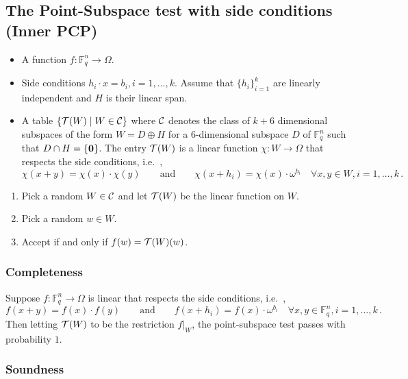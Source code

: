 \documentclass[10pt]{article}
\theoremstyle{definition}
\providecommand{\ie}{i.e.\ }
\numberwithin{equation}{section}
\newcommand\F{\mathbb{F}}
\renewcommand{\mapsto}{\to}
\begin{document}
\subsection{The Point-Subspace test with side conditions (Inner PCP)}\label{sec:point-subspace}

\begin{itemize}
\item A function $f: \F_q^n \mapsto \Omega$.
\item Side conditions $h_i \cdot x = b_i, i =1,\ldots, k$. Assume that $\{h_i\}_{i=1}^k$ are linearly independent and $H$ is their
    linear span.
\item A table $\left\{ {\cal T}(W) \mid  W \in {\cal C} \right\}$ where ${\cal C}$ denotes the class of $k+6$ dimensional subspaces of the form $W = D \oplus H$ for a $6$-dimensional subspace $D$ of $\F_q^n$ such that $D \cap H = \{ {\bf 0} \}$. The entry ${\cal T}(W)$ is a linear function $\chi: W \mapsto \Omega$ that respects the side conditions, \ie,
\[
\chi(x+y) = \chi(x)\cdot \chi(y)\qquad\text{and}\qquad \chi(x + h_i) =
\chi(x)\cdot  \omega^{b_i} \quad \forall x,y \in W, i=1,\ldots,k\,.
\]
\end{itemize}
\begin{enumerate}
\item Pick a random $W \in {\cal C}$ and let $ {\cal T}(W)$ be the linear function on $W$.
\item Pick a random $w \in W$.
\item Accept if and only if $f(w) = {\cal T}(W)(w)$.
\end{enumerate}

\subsubsection{Completeness}
Suppose $f: \F_q^n \mapsto \Omega$ is linear that respects the side
conditions, \ie, \[
f(x+y) = f(x)\cdot f(y) \qquad\text{and}\qquad f(x + h_i) = f(x)\cdot
\omega^{b_i} \quad \forall x,y \in \F_q^n, i=1,\ldots,k\,.
\]
Then letting
${\cal T}(W)$ to be the restriction $f|_W$, the point-subspace test passes with probability $1$.

\subsubsection{Soundness}
\end{document}
